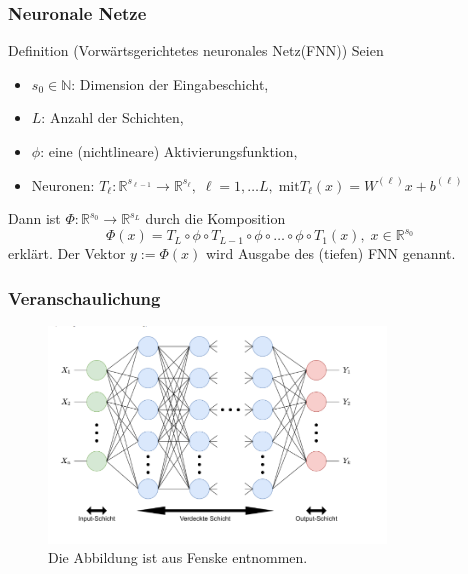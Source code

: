 \documentclass[10pt]{beamer} %
\newcommand{\RR}{\ensuremath{\mathbb{R}}}
\begin{document}
\begin{frame}
   \frametitle[]{Neuronale Netze}
   \begin{block}{Definition (Vorwärtsgerichtetes neuronales Netz(FNN))}
      Seien 
      \begin{itemize}
         \item $s_0 \in \mathbb{N}$: Dimension der Eingabeschicht,
         \item $L$: Anzahl der Schichten, 
         \item $\phi$: eine (nichtlineare) Aktivierungsfunktion,
         \item Neuronen: $T_{\ell}: \RR^{s_{\ell-1}} \rightarrow \RR^{s_\ell}, \; \ell=1, \ldots L, \; \text{mit} T_{\ell}(x)=W^{(\ell)}x+b^{(\ell)}$
      \end{itemize}
      \pause
      Dann ist $\Phi: \RR^{s_0} \rightarrow \RR^{s_L}$ durch die Komposition 
      \begin{equation*}
         \Phi(x)=T_{L} \circ \phi \circ T_{L-1} \circ \phi \circ \ldots \circ \phi \circ T_1(x), \; x \in \RR^{s_0}
      \end{equation*}
      erklärt. Der Vektor $y:=\Phi(x)$ wird Ausgabe des (tiefen) FNN genannt.
   \end{block}
\end{frame}

\begin{frame}
   \frametitle[]{Veranschaulichung}
   \begin{figure}
      \includegraphics[width=0.8\textwidth]{pics/full_FFN.png}
      \caption[]{Die Abbildung ist aus Fenske\cite[]{fenske} entnommen.}
   \end{figure}
\end{frame}

\end{document}
